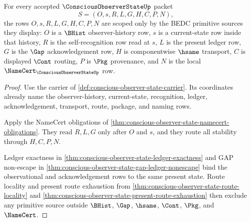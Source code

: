\begin{theorem}
\label{thm:conscious-observer-state-primitive-scope}
For every accepted $\ConsciousObserverStateUp$ packet
$$
S=(O,s,R,L,G,H,C,P,N),
$$
the rows $O,s,R,L,G,H,C,P,N$ are scoped only by the BEDC primitive sources they display: $O$ is a $\BHist$ observer-history row, $s$ is a current-state row inside that history, $R$ is the self-recognition row read at $s$, $L$ is the present ledger row, $G$ is the $\Gap$ acknowledgement row, $H$ is componentwise $\hsame$ transport, $C$ is displayed $\Cont$ routing, $P$ is $\Pkg$ provenance, and $N$ is the local $\NameCert_{\ConsciousObserverStateUp}$ row.
\end{theorem}
\begin{proof}
Use the carrier of \autoref{def:conscious-observer-state-carrier}. Its coordinates already name the observer-history, current-state, recognition, ledger, acknowledgement, transport, route, package, and naming rows.

Apply the NameCert obligations of \autoref{thm:conscious-observer-state-namecert-obligations}. They read $R,L,G$ only after $O$ and $s$, and they route all stability through $H,C,P,N$.

Ledger exactness in \autoref{thm:conscious-observer-state-ledger-exactness} and GAP non-escape in \autoref{thm:conscious-observer-state-gap-ledger-nonescape} bind the observational and acknowledgement rows to the same present state. Route locality and present route exhaustion from \autoref{thm:conscious-observer-state-route-locality} and \autoref{thm:conscious-observer-state-present-route-exhaustion} then exclude any primitive source outside $\BHist$, $\Gap$, $\hsame$, $\Cont$, $\Pkg$, and $\NameCert$.
\end{proof}


